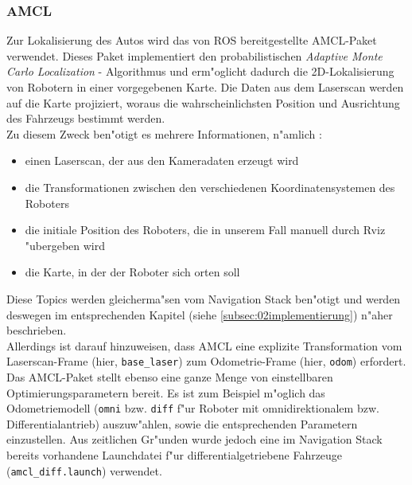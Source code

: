 \subsubsection{AMCL}
\label{subsec:02amcl}

Zur Lokalisierung des Autos wird das von ROS bereitgestellte AMCL-Paket verwendet. Dieses Paket implementiert den probabilistischen \emph{Adaptive Monte Carlo Localization} - Algorithmus und erm"oglicht dadurch die 2D-Lokalisierung von Robotern in einer vorgegebenen Karte. Die Daten aus dem Laserscan werden auf die Karte projiziert, woraus die wahrscheinlichsten Position und Ausrichtung des Fahrzeugs bestimmt werden.\\
Zu diesem Zweck ben"otigt es mehrere Informationen, n"amlich : 
\begin{itemize}
\item einen Laserscan, der aus den Kameradaten erzeugt wird 
\item die Transformationen zwischen den verschiedenen Koordinatensystemen des Roboters
\item die initiale Position des Roboters, die in unserem Fall manuell durch Rviz "ubergeben wird
\item die Karte, in der der Roboter sich orten soll
\end{itemize}

Diese Topics werden gleicherma"sen vom Navigation Stack ben"otigt und werden deswegen im entsprechenden Kapitel (siehe \ref{subsec:02implementierung}) n"aher beschrieben.\\
Allerdings ist darauf hinzuweisen, dass AMCL eine explizite Transformation vom Laserscan-Frame (hier, \texttt{base\_laser}) zum Odometrie-Frame (hier, \texttt{odom}) erfordert.\\
Das AMCL-Paket stellt ebenso eine ganze Menge von einstellbaren Optimierungsparametern bereit. Es ist zum Beispiel m"oglich das Odometriemodell (\texttt{omni} bzw. \texttt{diff} f"ur Roboter mit omnidirektionalem bzw. Differentialantrieb) auszuw"ahlen, sowie die entsprechenden Parametern einzustellen. Aus zeitlichen Gr"unden wurde jedoch eine im Navigation Stack bereits vorhandene Launchdatei f"ur differentialgetriebene Fahrzeuge (\texttt{amcl\_diff.launch}) verwendet.